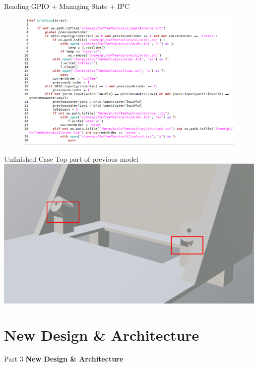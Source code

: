 \documentclass[t]{beamer}
\begin{document}
\begin{frame}{Reading GPIO + Managing State + IPC}
    \begin{figure}[h]
        \centering
        \includegraphics[trim={0cm 1mm 0cm 0cm},clip,width=\textwidth]{./images/code.png}
    \end{figure}
\end{frame}

\begin{frame}{Unfinished Case}
    \footnotesize{Top part of previous model}
    \includegraphics[width=\textwidth]{../thesis/images/case-top-annotated.png}
\end{frame}

\section{New Design \& Architecture}
\begin{frame}{Part 3}
    \Huge\textbf{New Design \& Architecture}
\end{frame}
\end{document}
